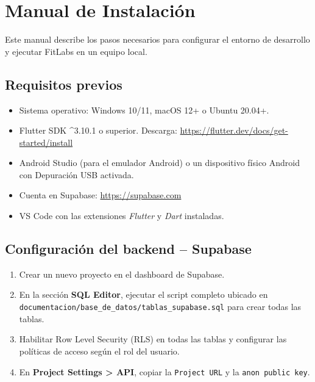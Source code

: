 \chapter{Manual de Instalación}
\label{anexo:instalacion}

Este manual describe los pasos necesarios para configurar el entorno de desarrollo y ejecutar FitLabs en un equipo local.

\section{Requisitos previos}

\begin{itemize}
  \item Sistema operativo: Windows 10/11, macOS 12+ o Ubuntu 20.04+.
  \item Flutter SDK \^{}3.10.1 o superior. Descarga: \url{https://flutter.dev/docs/get-started/install}
  \item Android Studio (para el emulador Android) o un dispositivo físico Android con Depuración USB activada.
  \item Cuenta en Supabase: \url{https://supabase.com}
  \item VS Code con las extensiones \textit{Flutter} y \textit{Dart} instaladas.
\end{itemize}

\section{Configuración del backend -- Supabase}

\begin{enumerate}
  \item Crear un nuevo proyecto en el dashboard de Supabase.
  \item En la sección \textbf{SQL Editor}, ejecutar el script completo ubicado en \texttt{documentacion/base\_de\_datos/tablas\_supabase.sql} para crear todas las tablas.
  \item Habilitar Row Level Security (RLS) en todas las tablas y configurar las políticas de acceso según el rol del usuario.
  \item En \textbf{Project Settings > API}, copiar la \texttt{Project URL} y la \texttt{anon public key}.
\end{enumerate}


